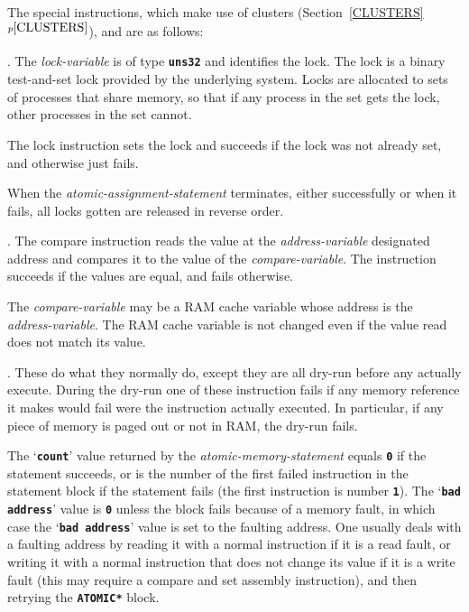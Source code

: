 \documentclass[12pt]{article}
\newcommand{\TT}[1]{{\tt \bfseries #1}}
\newcommand{\itemref}[1]{\ref{#1}$^{p\pageref{#1}}$}
\newenvironment{indpar}[1][0.3in]%
	{\begin{list}{}%
		     {\setlength{\itemsep}{0in}%
		      \setlength{\topsep}{0in}%
		      \setlength{\parsep}{1ex}%
		      \setlength{\labelwidth}{#1}%
		      \setlength{\leftmargin}{#1}%
		      \addtolength{\leftmargin}{\labelsep}}%
	 \item}%
	{\end{list}}
\begin{document}
The special instructions,
which make use of clusters (Section~\itemref{CLUSTERS}),
and are as follows:
\begin{indpar}[0.4in]
\hspace*{-0.2in}{\em \bf Lock-Instruction}.
The {\em lock-variable} is of type \TT{uns32}
and identifies the lock.
The lock is a binary test-and-set lock provided by the
underlying system.  Locks are allocated to sets of processes
that share memory, so that if any process in the set gets
the lock, other processes in the set cannot.

The lock instruction sets the lock and succeeds if the lock
was not already set, and otherwise just fails.

When the {\em atomic-assignment-statement} terminates, either
successfully or when it fails, all locks gotten are released in
reverse order.

\hspace*{-0.2in}{\em \bf Compare-Instruction}.
The compare
instruction reads the value at the {\em address-variable} designated
address and compares
it to the value of the {\em compare-variable}.  The instruction
succeeds if the values are equal, and fails otherwise.

The {\em compare-variable} may be a RAM cache variable whose
address is the {\em address-variable}.  The RAM cache variable
is not changed even if the value read does not match its value.

\hspace*{-0.2in}{\em \bf Write-Instructions}.
These do what they normally do, except they are all dry-run 
before any actually execute.  During the dry-run one of these
instruction fails if any memory reference it makes would fail
were the instruction actually executed.  In particular, if any
piece of memory is paged out or not in RAM, the dry-run fails.
\end{indpar}

The `\TT{count}' value returned by the {\em atomic-memory-statement}
equals \TT{0} if the statement succeeds, or is the number of the
first failed instruction in the statement block if the statement
fails (the first instruction is number \TT{1}).
The `\TT{bad address}' value is \TT{0} unless the block
fails because of a memory fault, in which case the `\TT{bad address}'
value is set to the faulting address.  One usually deals with a faulting
address by reading it with a normal instruction if it is a read fault,
or writing it with a normal instruction that does not change its
value if it is a write fault (this may require a compare and set
assembly instruction),
and then retrying the \TT{*ATOMIC*} block.
\end{document}

